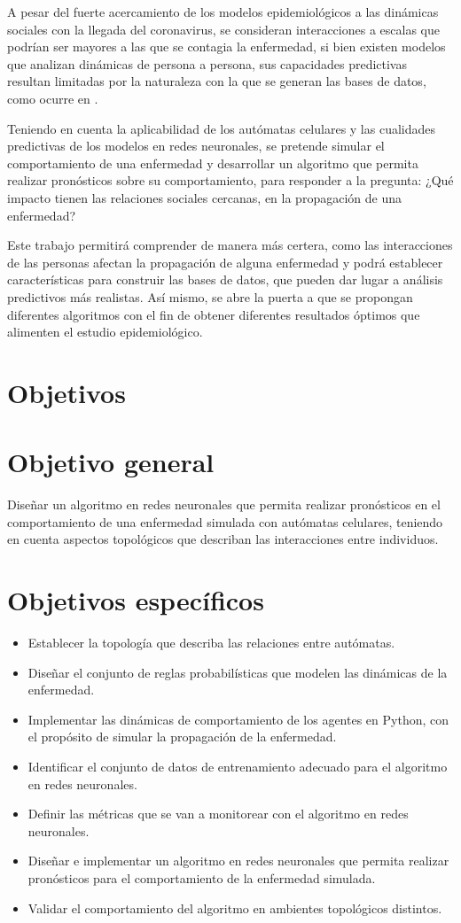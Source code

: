 \documentclass{article}
\begin{document}
A pesar del fuerte acercamiento de los modelos epidemiológicos a las dinámicas sociales con la llegada del coronavirus, se consideran interacciones a escalas que podrían ser mayores a las que se contagia la enfermedad, si bien existen modelos que analizan dinámicas de persona a persona, sus capacidades predictivas resultan limitadas por la naturaleza con la que se generan las bases de datos, como ocurre en \cite{combiningGraph,transfer2021}.

Teniendo en cuenta la aplicabilidad de los autómatas celulares y las cualidades predictivas de los modelos en redes neuronales, se pretende simular el comportamiento de una enfermedad y desarrollar un algoritmo que permita realizar pronósticos sobre su comportamiento, para responder a la pregunta: ¿Qué impacto tienen las relaciones sociales cercanas, en la propagación de una enfermedad?

Este trabajo permitirá comprender de manera más certera, como las interacciones de las personas afectan la propagación de alguna enfermedad y podrá establecer características para construir las bases de datos, que pueden dar lugar a análisis predictivos más realistas. Así mismo, se abre la puerta a que se propongan diferentes algoritmos con el fin de obtener diferentes resultados óptimos que alimenten el estudio epidemiológico.


\section{Objetivos}
\section*{Objetivo general}
Diseñar un algoritmo en redes neuronales que permita realizar pronósticos en el comportamiento de una enfermedad simulada con autómatas celulares, teniendo en cuenta aspectos topológicos que describan las interacciones entre individuos.
\section*{Objetivos específicos}
\begin{itemize}
    \item Establecer la topología que describa las relaciones entre autómatas.
    \item Diseñar el conjunto de reglas probabilísticas que modelen las dinámicas de la enfermedad.
    \item Implementar las dinámicas de comportamiento de los agentes en Python, con el propósito de simular la propagación de la enfermedad. 
    \item Identificar el conjunto de datos de entrenamiento adecuado para el algoritmo en redes neuronales.
    \item Definir las métricas que se van a monitorear con el algoritmo en redes neuronales.
    \item Diseñar e implementar un algoritmo en redes neuronales que permita realizar pronósticos para el comportamiento de la enfermedad simulada.
    \item Validar el comportamiento del algoritmo en ambientes topológicos distintos.
\end{itemize}
\end{document}
